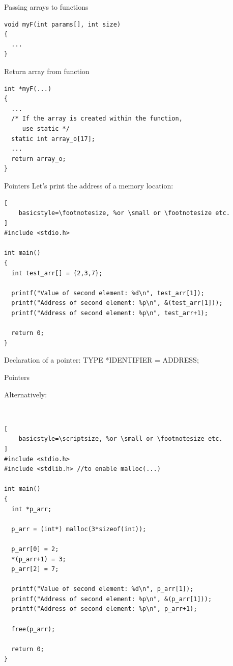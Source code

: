 \documentclass[10pt]{beamer}
\begin{document}
\begin{frame}[fragile]{Passing arrays to functions}
\begin{lstlisting}
void myF(int params[], int size)
{
  ...
}
\end{lstlisting}
\end{frame}


\begin{frame}[fragile]{Return array from function}
\begin{lstlisting}
int *myF(...)
{
  ...
  /* If the array is created within the function,
     use static */
  static int array_o[17];
  ...
  return array_o;
}
\end{lstlisting}
\end{frame}


\begin{frame}[fragile]{Pointers}
Let's print the address of a memory location:

\begin{lstlisting}[
    basicstyle=\footnotesize, %or \small or \footnotesize etc.
]
#include <stdio.h>

int main()
{
  int test_arr[] = {2,3,7};

  printf("Value of second element: %d\n", test_arr[1]);
  printf("Address of second element: %p\n", &(test_arr[1]));
  printf("Address of second element: %p\n", test_arr+1);

  return 0;
}
\end{lstlisting}

Declaration of a pointer: TYPE *IDENTIFIER = ADDRESS;
\end{frame}


\begin{frame}[fragile]{Pointers}

Alternatively:

\ \\

\begin{lstlisting}[
    basicstyle=\scriptsize, %or \small or \footnotesize etc.
]
#include <stdio.h>
#include <stdlib.h> //to enable malloc(...)

int main()
{
  int *p_arr;

  p_arr = (int*) malloc(3*sizeof(int));

  p_arr[0] = 2;
  *(p_arr+1) = 3;
  p_arr[2] = 7;

  printf("Value of second element: %d\n", p_arr[1]);
  printf("Address of second element: %p\n", &(p_arr[1]));
  printf("Address of second element: %p\n", p_arr+1);

  free(p_arr);

  return 0;
}
\end{lstlisting}
\end{frame}
\end{document}
